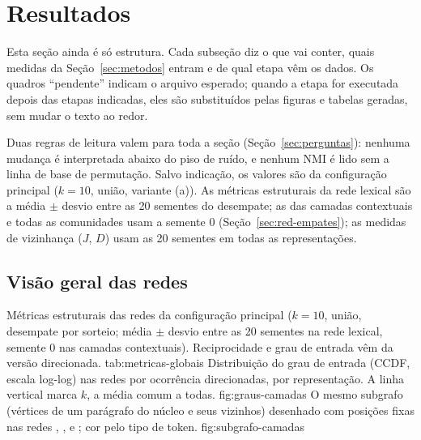 \section{Resultados}\label{sec:resultados}

Esta seção ainda é só estrutura. Cada subseção diz o que vai conter, quais medidas da
Seção~\ref{sec:metodos} entram e de qual etapa vêm os dados. Os quadros ``pendente'' indicam o
arquivo esperado; quando a etapa  for executada depois das etapas indicadas, eles
são substituídos pelas figuras e tabelas geradas, sem mudar o texto ao redor.

Duas regras de leitura valem para toda a seção (Seção~\ref{sec:perguntas}): nenhuma mudança é
interpretada abaixo do piso de ruído, e nenhum NMI é lido sem a linha de base de permutação.
Salvo indicação, os valores são da configuração principal ($k=10$, união, variante (a)). As
métricas estruturais da rede lexical são a média $\pm$ desvio entre as 20 sementes do
desempate; as das camadas contextuais e todas as comunidades usam a semente 0
(Seção~\ref{sec:red-empates}); as medidas de vizinhança ($J$, $D$) usam as 20 sementes em todas
as representações.

\subsection{Visão geral das redes}\label{sec:res-geral}


    {Métricas estruturais das redes da configuração principal ($k=10$, união, desempate por
    sorteio; média $\pm$ desvio entre as 20 sementes na rede lexical, semente 0 nas camadas
    contextuais). Reciprocidade e grau de entrada vêm da versão direcionada.}
    {tab:metricas-globais}
    {Distribuição do grau de entrada (CCDF, escala log-log) nas redes por ocorrência
    direcionadas, por representação. A linha vertical marca $k$, a média comum a todas.}
    {fig:graus-camadas}
    {O mesmo subgrafo (vértices de um parágrafo do núcleo e seus vizinhos) desenhado com
    posições fixas nas redes , ,  e ; cor pelo tipo de
    token.}
    {fig:subgrafo-camadas}

